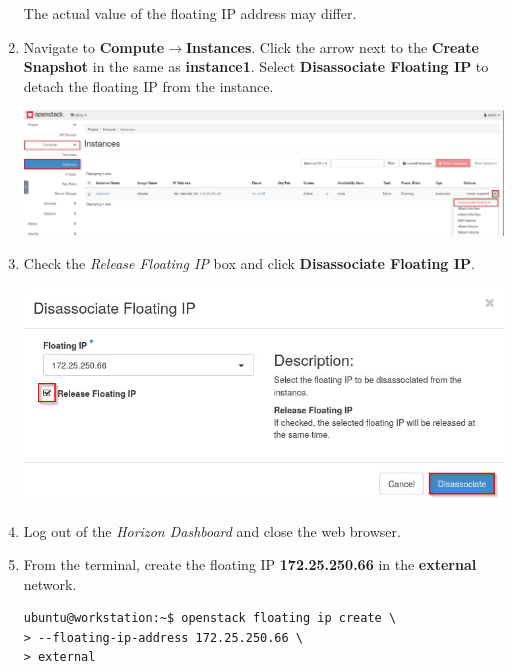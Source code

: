\documentclass[letterpaper, 12pt]{article}
\begin{document}
\begin{enumerate}
    \begin{notebox}{}
        The actual value of the floating IP address may differ.
    \end{notebox}

    \item Navigate to \textbf{Compute$\rightarrow$Instances}. Click the arrow next to the \textbf{Create Snapshot} in
    the same as \textbf{instance1}. Select \textbf{Disassociate Floating IP} to detach the floating IP from the
    instance.

    \begin{center}
        \includegraphics[width=\linewidth]{images/part3/step8.png}
    \end{center}

    \item Check the \textit{Release Floating IP} box and click \textbf{Disassociate Floating IP}.
    
    \begin{center}
        \includegraphics[width=\linewidth]{images/part3/step9.png}
    \end{center}

    \item Log out of the \textit{Horizon Dashboard} and close the web browser.

    \item From the terminal, create the floating IP \textbf{172.25.250.66} in the \textbf{external} network.
\begin{lstlisting}
ubuntu@workstation:~$ openstack floating ip create \
> --floating-ip-address 172.25.250.66 \
> external
\end{lstlisting}


\end{enumerate}
\end{document}
